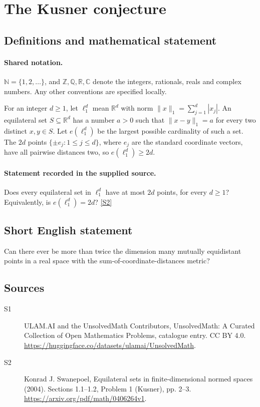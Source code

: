 \documentclass[11pt]{article}
\newcommand{\sref}[2]{\hyperlink{source:#1:#2}{[S#2]}}
\begin{document}
\section{The Kusner conjecture}\label{statement}

\subsection{Definitions and mathematical statement}

\paragraph{Shared notation.}$\mathbb N=\{1,2,\ldots\}$, and $\mathbb Z,\mathbb Q,\mathbb R,\mathbb C$ denote the integers, rationals, reals and complex numbers. Any other conventions are specified locally.


For an integer $d\geq1$, let $\ell_1^d$ mean $\mathbb R^d$ with norm $\|x\|_1=\sum_{j=1}^d|x_j|$. An equilateral set $S\subseteq\mathbb R^d$ has a number $a>0$ such that $\|x-y\|_1=a$ for every two distinct $x,y\in S$. Let $e(\ell_1^d)$ be the largest possible cardinality of such a set. The $2d$ points $\{\pm e_j:1\leq j\leq d\}$, where $e_j$ are the standard coordinate vectors, have all pairwise distances two, so $e(\ell_1^d)\geq2d$.
\paragraph{Statement recorded in the supplied source.}
Does every equilateral set in $\ell_1^d$ have at most $2d$ points, for every $d\geq1$? Equivalently, is $e(\ell_1^d)=2d$? \sref{statement}{2}
\subsection{Short English statement}
Can there ever be more than twice the dimension many mutually equidistant points in a real space with the sum-of-coordinate-distances metric?
\subsection{Sources}
\begin{description}
\item[\hypertarget{source:statement:1}{S1}] ULAM.AI and the UnsolvedMath Contributors, UnsolvedMath: A Curated Collection of Open Mathematics Problems, catalogue entry. CC BY 4.0. \url{https://huggingface.co/datasets/ulamai/UnsolvedMath}.
\item[\hypertarget{source:statement:2}{S2}] Konrad J. Swanepoel, Equilateral sets in finite-dimensional normed spaces (2004). Sections 1.1–1.2, Problem 1 (Kusner), pp. 2–3. \url{https://arxiv.org/pdf/math/0406264v1}.
\end{description}
\label{end:statement}
\end{document}
